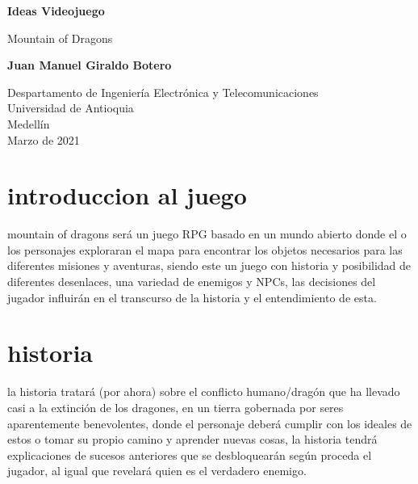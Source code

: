 \documentclass{article}
\begin{document}
\begin{titlepage}
    \begin{center}
        \vspace*{1cm}
            
        \Huge
        \textbf{Ideas Videojuego}
            
        \vspace{0.5cm}
        \LARGE
        Mountain of Dragons
            
        \vspace{1.5cm}
            
        \textbf{Juan Manuel Giraldo Botero}
            
        \vfill
            
        \vspace{0.8cm}
            
        \Large
        Despartamento de Ingeniería Electrónica y Telecomunicaciones\\
        Universidad de Antioquia\\
        Medellín\\
        Marzo de 2021
            
    \end{center}
\end{titlepage}

\newpage
\section{introduccion al juego}
mountain of dragons será un juego RPG basado en un mundo abierto donde el o los personajes exploraran el mapa para encontrar los objetos necesarios para las diferentes misiones y aventuras, siendo este un juego con historia y posibilidad de diferentes desenlaces, una variedad de enemigos y NPCs, las decisiones del jugador influirán en el transcurso de la historia y el entendimiento de esta.
\vspace{1cm}

\section{historia}
la historia tratará (por ahora) sobre el conflicto humano/dragón que ha llevado casi a la extinción de los dragones, en un tierra gobernada por seres aparentemente benevolentes, donde el personaje deberá cumplir con los ideales de estos o tomar su propio camino y aprender nuevas cosas, la historia tendrá explicaciones de sucesos anteriores que se desbloquearán según proceda el jugador, al igual que revelará quien es el verdadero enemigo.  
\vspace{1cm}
\end{document}
